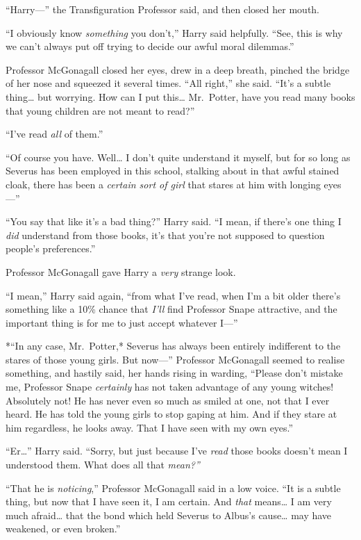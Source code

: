 ``Harry---'' the Transfiguration Professor said, and then closed her
mouth.

``I obviously know \emph{something} you don't,'' Harry said helpfully.
``See, this is why we can't always put off trying to decide our awful
moral dilemmas.''

Professor McGonagall closed her eyes, drew in a deep breath, pinched the
bridge of her nose and squeezed it several times. ``All right,'' she
said. ``It's a subtle thing\ldots{} but worrying. How can I put
this\ldots{} Mr.~Potter, have you read many books that young children
are not meant to read?''

``I've read \emph{all} of them.''

``Of course you have. Well\ldots{} I don't quite understand it myself,
but for so long as Severus has been employed in this school, stalking
about in that awful stained cloak, there has been a \emph{certain sort
of girl} that stares at him with longing eyes---''

``You say that like it's a bad thing?'' Harry said. ``I mean, if there's
one thing I \emph{did} understand from those books, it's that you're not
supposed to question people's preferences.''

Professor McGonagall gave Harry a \emph{very} strange look.

``I mean,'' Harry said again, ``from what I've read, when I'm a bit
older there's something like a 10\% chance that \emph{I'll} find
Professor Snape attractive, and the important thing is for me to just
accept whatever I---''

*``In any case, Mr.~Potter,* Severus has always been entirely
indifferent to the stares of those young girls. But now---'' Professor
McGonagall seemed to realise something, and hastily said, her hands
rising in warding, ``Please don't mistake me, Professor Snape
\emph{certainly} has not taken advantage of any young witches!
Absolutely not! He has never even so much as smiled at one, not that I
ever heard. He has told the young girls to stop gaping at him. And if
they stare at him regardless, he looks away. That I have seen with my
own eyes.''

``Er\ldots{}'' Harry said. ``Sorry, but just because I've \emph{read}
those books doesn't mean I understood them. What does all that
\emph{mean?''}

``That he is \emph{noticing},'' Professor McGonagall said in a low
voice. ``It is a subtle thing, but now that I have seen it, I am
certain. And \emph{that} means\ldots{} I am very much afraid\ldots{}
that the bond which held Severus to Albus's cause\ldots{} may have
weakened, or even broken.''

